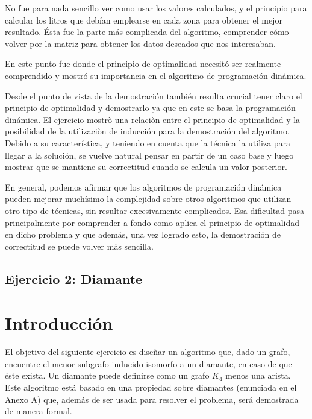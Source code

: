 \documentclass[a4paper,11pt] {article}
\begin{document}
No fue para nada sencillo ver como usar los valores calculados, y el principio para calcular los litros que debían emplearse en cada zona para obtener el mejor resultado. Ésta fue la parte más complicada del algoritmo, comprender cómo volver por la matriz para obtener los datos deseados que nos interesaban.

En este punto fue donde el principio de optimalidad necesitó ser realmente comprendido y mostró su importancia en el algoritmo de programación dinámica.

Desde el punto de vista de la demostración también resulta crucial tener claro el principio de optimalidad y demostrarlo ya que en este se basa la programación dinámica. El ejercicio mostrò una relaciòn entre el principio de optimalidad y la posibilidad de la utilizaciòn de inducción para la demostración del algoritmo. Debido a su característica, y teniendo en cuenta que la técnica la utiliza para llegar a la solución, se vuelve natural pensar en partir de un caso base y luego mostrar que se mantiene su correctitud cuando se calcula un valor posterior.

En general, podemos afirmar que los algoritmos de programación dinámica pueden mejorar muchísimo la complejidad sobre otros algoritmos que utilizan otro tipo de técnicas, sin resultar excesivamente complicados. Esa dificultad pasa principalmente por comprender a fondo como aplica el principio de optimalidad en dicho problema y que además, una vez logrado esto, la demostración de correctitud se puede volver màs sencilla.

\bigskip

\begin{center}
\section*{Ejercicio 2: Diamante}
\end{center}

\bigskip
\section*{Introducci\'on}

El objetivo del siguiente ejercicio es dise\~{n}ar un algoritmo que, dado un grafo, encuentre el menor subgrafo inducido isomorfo a un diamante, en caso de que \'este exista. Un diamante puede definirse como un grafo $K_{4}$ menos una arista. Este algoritmo est\'a basado en una propiedad sobre diamantes (enunciada en el Anexo A) que, adem\'as de ser usada para resolver el problema, ser\'a demostrada de manera formal.
\end{document}
